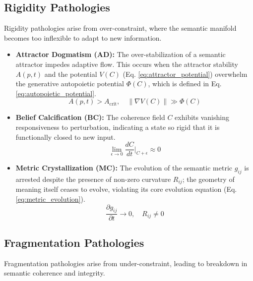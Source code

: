 \subsection{Rigidity Pathologies}

Rigidity pathologies arise from over-constraint, where the semantic manifold becomes too inflexible to adapt to new information.

\begin{itemize}
    \item \textbf{Attractor Dogmatism (AD):} The over-stabilization of a semantic attractor impedes adaptive flow. This occurs when the attractor stability \(A(p,t)\) and the potential \(V(C)\) (Eq. \ref{eq:attractor_potential}) overwhelm the generative autopoietic potential \(\Phi(C)\), which is defined in Eq. \ref{eq:autopoietic_potential}.
    \begin{equation}
    A(p,t) > A_{\text{crit}}, \quad \|\nabla V(C)\| \gg \Phi(C)
    \end{equation}

    \item \textbf{Belief Calcification (BC):} The coherence field \(C\) exhibits vanishing responsiveness to perturbation, indicating a state so rigid that it is functionally closed to new input.
    \begin{equation}
    \lim_{\epsilon \to 0} \frac{dC}{dt}\bigg|_{C+\epsilon} \approx 0
    \end{equation}

    \item \textbf{Metric Crystallization (MC):} The evolution of the semantic metric \(g_{ij}\) is arrested despite the presence of non-zero curvature \(R_{ij}\); the geometry of meaning itself ceases to evolve, violating its core evolution equation (Eq. \ref{eq:metric_evolution}).
    \begin{equation}
    \frac{\partial g_{ij}}{\partial t} \to 0, \quad R_{ij} \neq 0
    \end{equation}
\end{itemize}

\subsection{Fragmentation Pathologies}

Fragmentation pathologies arise from under-constraint, leading to breakdown in semantic coherence and integrity.

